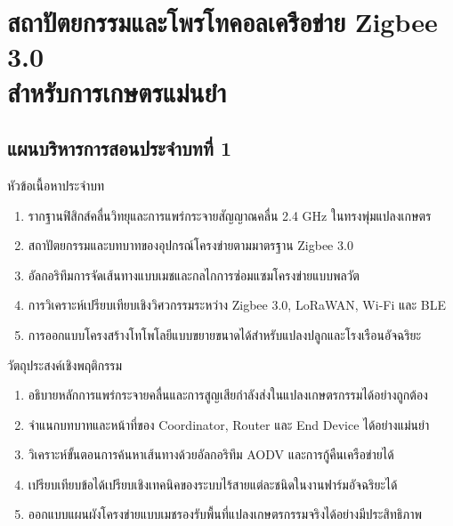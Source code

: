 \chapter[สถาปัตยกรรมและโพรโทคอลเครือข่าย Zigbee 3.0 สำหรับการเกษตรแม่นยำ]{สถาปัตยกรรมและโพรโทคอลเครือข่าย Zigbee 3.0\\สำหรับการเกษตรแม่นยำ}
\label{chap:ch01}

\section*{แผนบริหารการสอนประจำบทที่ 1}

\begin{planbox}{หัวข้อเนื้อหาประจำบท}
\begin{enumerate}[topsep=1pt, itemsep=0.5pt, partopsep=0pt, parsep=0pt, leftmargin=1.5em]
    \item รากฐานฟิสิกส์คลื่นวิทยุและการแพร่กระจายสัญญาณคลื่น 2.4 GHz ในทรงพุ่มแปลงเกษตร
    \item สถาปัตยกรรมและบทบาทของอุปกรณ์โครงข่ายตามมาตรฐาน Zigbee 3.0
    \item อัลกอริทึมการจัดเส้นทางแบบเมชและกลไกการซ่อมแซมโครงข่ายแบบพลวัต
    \item การวิเคราะห์เปรียบเทียบเชิงวิศวกรรมระหว่าง Zigbee 3.0, LoRaWAN, Wi-Fi และ BLE
    \item การออกแบบโครงสร้างโทโพโลยีแบบขยายขนาดได้สำหรับแปลงปลูกและโรงเรือนอัจฉริยะ
\end{enumerate}
\end{planbox}

\begin{planbox}{วัตถุประสงค์เชิงพฤติกรรม}
\begin{enumerate}[topsep=1pt, itemsep=0.5pt, partopsep=0pt, parsep=0pt, leftmargin=1.5em]
    \item อธิบายหลักการแพร่กระจายคลื่นและการสูญเสียกำลังส่งในแปลงเกษตรกรรมได้อย่างถูกต้อง
    \item จำแนกบทบาทและหน้าที่ของ Coordinator, Router และ End Device ได้อย่างแม่นยำ
    \item วิเคราะห์ขั้นตอนการค้นหาเส้นทางด้วยอัลกอริทึม AODV และการกู้คืนเครือข่ายได้
    \item เปรียบเทียบข้อได้เปรียบเชิงเทคนิคของระบบไร้สายแต่ละชนิดในงานฟาร์มอัจฉริยะได้
    \item ออกแบบแผนผังโครงข่ายแบบเมชรองรับพื้นที่แปลงเกษตรกรรมจริงได้อย่างมีประสิทธิภาพ
\end{enumerate}
\end{planbox}


